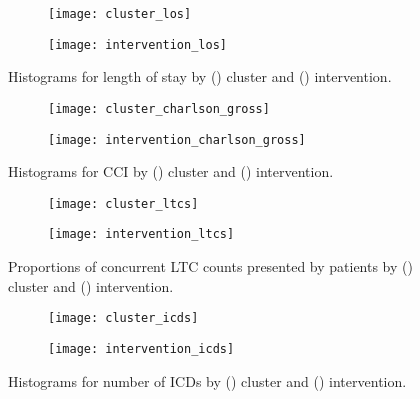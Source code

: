 \begin{figure}
    \centering
    \begin{subfigure}{\halfimgwidth}
        \texttt{[image: cluster\_los]}
        \caption{}\label{fig:cluster_los}
    \end{subfigure}\hfill%
    \begin{subfigure}{\halfimgwidth}
        \texttt{[image: intervention\_los]}
        \caption{}\label{fig:intervention_los}
    \end{subfigure}
    \caption{%
        Histograms for length of stay by () cluster and
        () intervention.
    }\label{fig:los_hist}
\end{figure}

\begin{figure}
    \centering
    \begin{subfigure}{\halfimgwidth}
        \texttt{[image: cluster\_charlson\_gross]}
        \caption{}\label{fig:cluster_charlson}
    \end{subfigure}\hfill%
    \begin{subfigure}{\halfimgwidth}
        \texttt{[image: intervention\_charlson\_gross]}
        \caption{}\label{fig:intervention_charlson}
    \end{subfigure}
    \caption{%
        Histograms for CCI by () cluster and
        () intervention.
    }\label{fig:charlson_hist}
\end{figure}

\begin{figure}
    \centering
    \begin{subfigure}{\halfimgwidth}
        \texttt{[image: cluster\_ltcs]}
        \caption{}\label{fig:cluster_ltcs}
    \end{subfigure}\hfill%
    \begin{subfigure}{\halfimgwidth}
        \texttt{[image: intervention\_ltcs]}
        \caption{}\label{fig:intervention_ltcs}
    \end{subfigure}
    \caption{%
        Proportions of concurrent LTC counts presented by patients by
        () cluster and ()
        intervention.
    }\label{fig:ltcs}
\end{figure}

\begin{figure}
    \centering
    \begin{subfigure}{\halfimgwidth}
        \texttt{[image: cluster\_icds]}
        \caption{}\label{fig:cluster_icds}
    \end{subfigure}\hfill%
    \begin{subfigure}{\halfimgwidth}
        \texttt{[image: intervention\_icds]}
        \caption{}\label{fig:intervention_icds}
    \end{subfigure}
    \caption{%
        Histograms for number of ICDs by () cluster
        and () intervention.
    }\label{fig:icds}
\end{figure}
